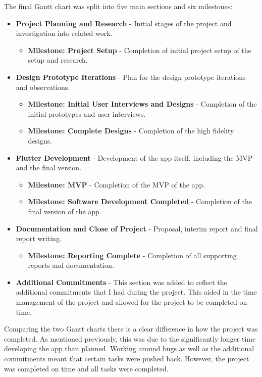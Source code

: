 \documentclass [11pt,a4paper]{article}
\begin{document}
The final Gantt chart was split into five main sections and six milestones:
\begin{itemize}[noitemsep]
    \item \textbf{Project Planning and Research} - Initial stages of the project and investigation into related work.
    \begin{itemize}[noitemsep]
        \item \textbf{Milestone: Project Setup} - Completion of initial project setup of the setup and research.
    \end{itemize}
    \item \textbf{Design Prototype Iterations} - Plan for the design prototype iterations and observations.
    \begin{itemize}[noitemsep]
        \item \textbf{Milestone: Initial User Interviews and Designs} - Completion of the initial prototypes and user interviews.
        \item \textbf{Milestone: Complete Designs} - Completion of the high fidelity designs.
    \end{itemize}
    \item \textbf{Flutter Development} - Development of the app itself, including the MVP and the final version.
    \begin{itemize}[noitemsep]
        \item \textbf{Milestone: MVP} - Completion of the MVP of the app.
        \item \textbf{Milestone: Software Development Completed} - Completion of the final version of the app.
    \end{itemize}
    \item \textbf{Documentation and Close of Project} - Proposal, interim report and final report writing. 
    \begin{itemize}
        \item \textbf{Milestone: Reporting Complete} - Completion of all supporting reports and documentation.
    \end{itemize}
    \item \textbf{Additional Commitments} - This section was added to reflect the additional commitments that I had during the project. This aided in the time management of the project and allowed for the project to be completed on time.
\end{itemize}

Comparing the two Gantt charts there is a clear difference in how the project was completed. As mentioned previously, this was due to the significantly longer time developing the app than planned. Working around bugs as well as the additional commitments meant that certain tasks were pushed back. However, the project was completed on time and all tasks were completed.
\end{document}
